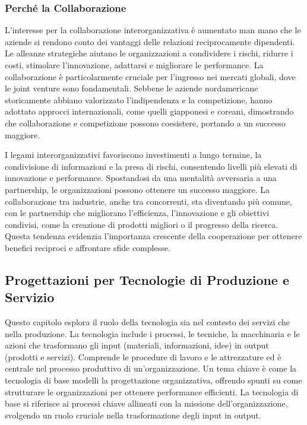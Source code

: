 \documentclass{article}
\begin{document}
\subsubsection{Perché la Collaborazione}

L'interesse per la collaborazione interorganizzativa è aumentato man mano che le aziende si rendono conto dei vantaggi delle relazioni reciprocamente dipendenti. Le alleanze strategiche aiutano le organizzazioni a condividere i rischi, ridurre i costi, stimolare l'innovazione, adattarsi e migliorare le performance. La collaborazione è particolarmente cruciale per l'ingresso nei mercati globali, dove le joint venture sono fondamentali. Sebbene le aziende nordamericane storicamente abbiano valorizzato l'indipendenza e la competizione, hanno adottato approcci internazionali, come quelli giapponesi e coreani, dimostrando che collaborazione e competizione possono coesistere, portando a un successo maggiore.

I legami interorganizzativi favoriscono investimenti a lungo termine, la condivisione di informazioni e la presa di rischi, consentendo livelli più elevati di innovazione e performance. Spostandosi da una mentalità avversaria a una partnership, le organizzazioni possono ottenere un successo maggiore. La collaborazione tra industrie, anche tra concorrenti, sta diventando più comune, con le partnership che migliorano l'efficienza, l'innovazione e gli obiettivi condivisi, come la creazione di prodotti migliori o il progresso della ricerca. Questa tendenza evidenzia l'importanza crescente della cooperazione per ottenere benefici reciproci e affrontare sfide complesse.

\subsection{Progettazioni per Tecnologie di Produzione e Servizio}

Questo capitolo esplora il ruolo della tecnologia sia nel contesto dei servizi che nella produzione. La tecnologia include i processi, le tecniche, la macchinaria e le azioni che trasformano gli input (materiali, informazioni, idee) in output (prodotti e servizi). Comprende le procedure di lavoro e le attrezzature ed è centrale nel processo produttivo di un'organizzazione. Un tema chiave è come la tecnologia di base modelli la progettazione organizzativa, offrendo spunti su come strutturare le organizzazioni per ottenere performance efficienti. La tecnologia di base si riferisce ai processi chiave allineati con la missione dell'organizzazione, svolgendo un ruolo cruciale nella trasformazione degli input in output.
\end{document}
